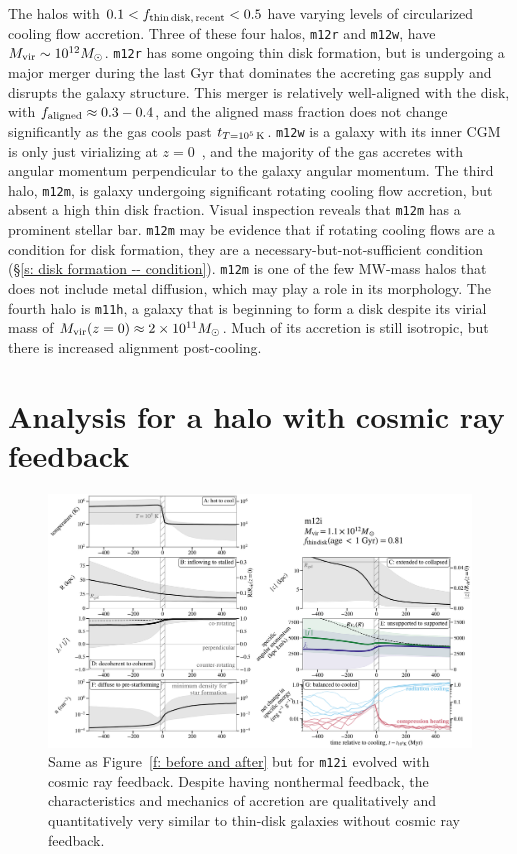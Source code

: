 \documentclass[fleqn,usenatbib]{mnras}
\newcommand{\tcon}{t_{T=10^5\,{\rm K}}}
\begin{document}
The halos with $0.1 < f_{\rm thin\,disk,\,recent} < 0.5$ have varying levels of circularized cooling flow accretion.
Three of these four halos, \texttt{m12r} and \texttt{m12w}, have $M_{\rm vir} \sim 10^{12} M_\odot$.
\texttt{m12r} has some ongoing thin disk formation, but is undergoing a major merger during the last Gyr that dominates the accreting gas supply and disrupts the galaxy structure.
This merger is relatively well-aligned with the disk, with $f_{\rm aligned} \approx 0.3-0.4$, and the aligned mass fraction does not change significantly as the gas cools past $\tcon$.
\texttt{m12w} is a galaxy with its inner CGM is only just virializing at $z=0$~\citep{Yu2021}, and the majority of the gas accretes with angular momentum perpendicular to the galaxy angular momentum.
The third halo, \texttt{m12m}, is galaxy undergoing significant rotating cooling flow accretion, but absent a high thin disk fraction.
Visual inspection reveals that \texttt{m12m} has a prominent stellar bar.
\texttt{m12m} may be evidence that if rotating cooling flows are a condition for disk formation, they are a necessary-but-not-sufficient condition (\S\ref{s: disk formation -- condition}).
\texttt{m12m} is one of the few MW-mass halos that does not include metal diffusion, which may play a role in its morphology.
The fourth halo is \texttt{m11h}, a galaxy that is beginning to form a disk despite its virial mass of $M_{\rm vir}(z=0) \approx 2 \times 10^{11} M_\odot$.
Much of its accretion is still isotropic, but there is increased alignment post-cooling.



\section{Analysis for a halo with cosmic ray feedback}
\label{s: appendix-crs}

\begin{figure}
\includegraphics[width=\textwidth]{figures/before_and_after/before_and_after_m12i_cr.pdf}
\caption{
Same as Figure~\ref{f: before and after} but for \texttt{m12i} evolved with cosmic ray feedback.
Despite having nonthermal feedback, the characteristics and mechanics of accretion are qualitatively and quantitatively very similar to thin-disk galaxies without cosmic ray feedback.
}
\label{f: before and after -- cr}
\end{figure}
\end{document}
